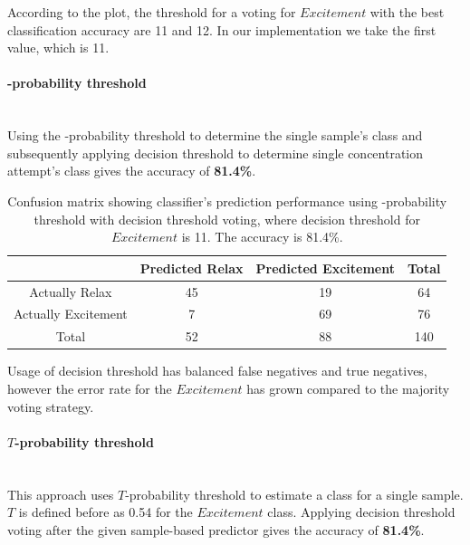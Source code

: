 \documentclass[12pt]{article}
\theoremstyle{definition}
\begin{document}
According to the plot, the threshold for a voting for $Excitement$ with the best classification accuracy are 11 and 12. In our implementation we take the first value, which is 11.

\paragraph{-probability threshold}~\\

Using the -probability threshold to determine the single sample's class and subsequently applying decision threshold to determine single concentration attempt's class gives the accuracy of \textbf{81.4\%}.
\begin{table}[H]
\begin{center}
  \begin{tabular}{ | c | c | c | c | }
    \hline
     & Predicted Relax & Predicted Excitement & Total \\ \hline
    Actually Relax & 45 & 19 & 64 \\ \hline
    Actually Excitement & 7 & 69 & 76 \\ \hline
    Total & 52 & 88 & 140 \\ 
    \hline
  \end{tabular}
\end{center}
\caption{Confusion matrix showing classifier's prediction performance using -probability threshold with decision threshold voting, where decision threshold for $Excitement$ is 11. The accuracy is 81.4\%.} 
\end{table}

Usage of decision threshold has balanced false negatives and true negatives, however the error rate for the $Excitement$ has grown compared to the majority voting strategy.

\paragraph{$T$-probability threshold}~\\

This approach uses $T$-probability threshold to estimate a class for a single sample. $T$ is defined before as 0.54 for the $Excitement$ class. Applying decision threshold voting after the given sample-based predictor gives the accuracy of \textbf{81.4\%}.
\end{document}
